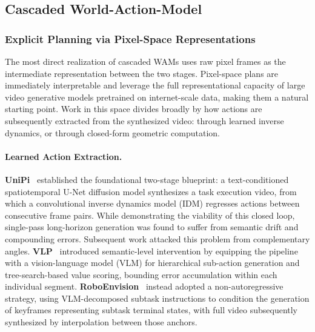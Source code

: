 \subsection{Cascaded World-Action-Model}

\label{sec:cascaded_wam}





\subsubsection{Explicit Planning via Pixel-Space Representations}

\label{sec:cacaded_wam_explicit}

The most direct realization of cascaded WAMs uses raw pixel frames as the intermediate representation between the two stages. Pixel-space plans are immediately interpretable and leverage the full representational capacity of large video generative models pretrained on internet-scale data, making them a natural starting point. Work in this space divides broadly by how actions are subsequently extracted from the synthesized video: through learned inverse dynamics, or through closed-form geometric computation.


\paragraph{Learned Action Extraction.}

\textbf{UniPi}~\cite{unipi} established the foundational two-stage blueprint: a text-conditioned spatiotemporal U-Net diffusion model synthesizes a task execution video, from which a convolutional inverse dynamics model (IDM) regresses actions between consecutive frame pairs. While demonstrating the viability of this closed loop, single-pass long-horizon generation was found to suffer from semantic drift and compounding errors. Subsequent work attacked this problem from complementary angles. \textbf{VLP}~\cite{du2023vlp} introduced semantic-level intervention by equipping the pipeline with a vision-language model (VLM) for hierarchical sub-action generation and tree-search-based value scoring, bounding error accumulation within each individual segment. \textbf{RoboEnvision}~\cite{yang2025roboenvision} instead adopted a non-autoregressive strategy, using VLM-decomposed subtask instructions to condition the generation of keyframes representing subtask terminal states, with full video subsequently synthesized by interpolation between those anchors.

